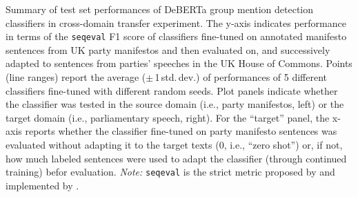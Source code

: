 Summary of test set performances of DeBERTa group mention detection classifiers in cross-domain transfer experiment. The y-axis indicates performance in terms of the \texttt{seqeval} F1 score of classifiers fine-tuned on annotated manifesto sentences from UK party manifestos and then evaluated on, and successively adapted to sentences from parties' speeches in the UK House of Commons. Points (line ranges) report the average ($\pm$\,1\,std.\,dev.) of performances of 5 different classifiers fine-tuned with different random seeds. Plot panels indicate whether the classifier was tested in the source domain (i.e., party manifestos, left) or the target domain (i.e., parliamentary speech, right). For the ``target'' panel, the x-axis reports whether the classifier fine-tuned on party manifesto sentences was evaluated without adapting it to the target texts (0, i.e., ``zero shot'') or, if not, how much labeled sentences were used to adapt the classifier (through continued training) befor evaluation. \emph{Note:} \texttt{seqeval} is the strict metric proposed by \citet{ramshaw_text_1995} and implemented by \citet{nakayama_seqeval_2018}. \label{fig:uk_cross-domain-transfer_deberta-finetuning_testset}
